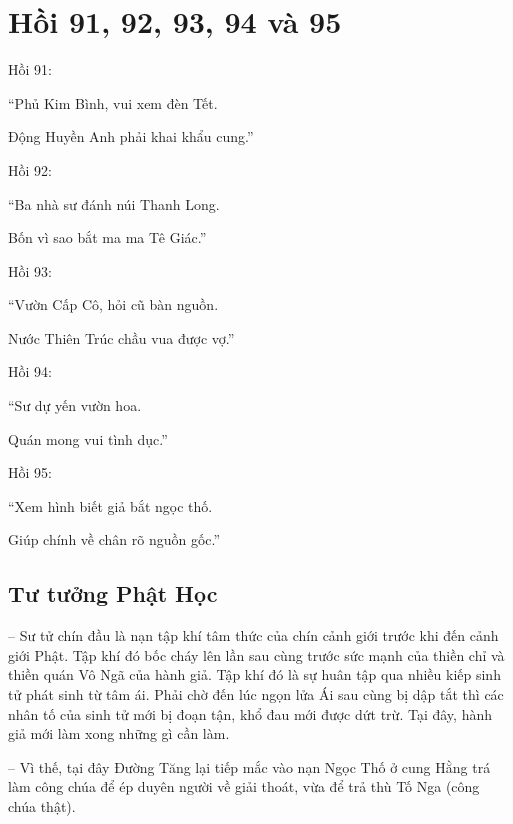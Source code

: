 \chapter{Hồi 91, 92, 93, 94 và 95} %
\label{cha:hoi_91_92_95}

Hồi 91:

\begin{itshape}
``Phủ Kim Bình, vui xem đèn Tết.

Động Huyền Anh phải khai khẩu cung.''
\end{itshape}

Hồi 92:

\begin{itshape}
``Ba nhà sư đánh núi Thanh Long.

Bốn vì sao bắt ma ma Tê Giác.''
\end{itshape}

Hồi 93:

\begin{itshape}
``Vườn Cấp Cô, hỏi cũ bàn nguồn.

Nước Thiên Trúc chầu vua được vợ.''
\end{itshape}

Hồi 94:

\begin{itshape}
``Sư dự yến vườn hoa.

Quán mong vui tình dục.''
\end{itshape}

Hồi 95:

\begin{itshape}
``Xem hình biết giả bắt ngọc thố.

Giúp chính về chân rõ nguồn gốc.''
\end{itshape}

\section{Tư tưởng Phật Học} %
\label{sec:91_92_95_phat_hoc}

-- Sư tử chín đầu là nạn tập khí tâm thức của chín cảnh giới trước khi đến cảnh giới Phật. Tập khí đó bốc cháy lên lần sau cùng trước sức mạnh của thiền chỉ và thiền quán Vô Ngã của hành giả. Tập khí đó là sự huân tập qua nhiều kiếp sinh tử phát sinh từ tâm ái. Phải chờ đến lúc ngọn lửa Ái sau cùng bị dập tắt thì các nhân tố của sinh tử mới bị đoạn tận, khổ đau mới được dứt trừ. Tại đây, hành giả mới làm xong những gì cần làm.

-- Vì thế, tại đây Đường Tăng lại tiếp mắc vào nạn Ngọc Thố ở cung Hằng trá làm công chúa để ép duyên người về giải thoát, vừa để trả thù Tố Nga (công chúa thật).

